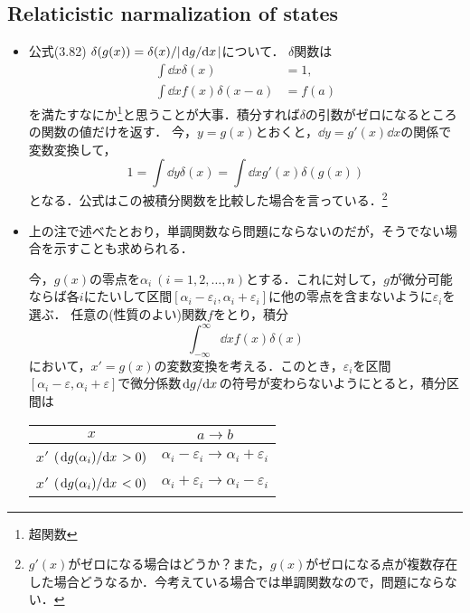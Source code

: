 \subsection{Relaticistic narmalization of states}
\begin{itemize}
		\item 公式(3.82) $\delta(g(x)) = \delta(x)/\lvert\dv*{g}{x}\rvert$について．
				$\delta $関数は
				\begin{align}
						\int \dd{x} \delta(x) &= 1, \\
						\int \dd{x} f(x)\delta(x-a) &= f(a)
				\end{align}
				を満たすなにか\footnote{超関数}と思うことが大事．積分すれば$\delta $の引数がゼロになるところの関数の値だけを返す．
				今，$y=g(x)  $とおくと，$\dd{y} = g'(x)\dd{x} $の関係で変数変換して，
				\begin{equation}
						1 = \int\dd{y} \delta(x) = \int \dd{x}g'(x)\delta(g(x))
				\end{equation}
				となる．公式はこの被積分関数を比較した場合を言っている．\footnote{$g'(x)$がゼロになる場合はどうか？また，$g(x) $がゼロになる点が複数存在した場合どうなるか．今考えている場合では単調関数なので，問題にならない．}
		\item 上の注で述べたとおり，単調関数なら問題にならないのだが，そうでない場合を示すことも求められる．

				今，$g(x) $の零点を$\alpha_i \ (i=1, 2, \ldots, n)$とする．これに対して，$g $が微分可能ならば各$i $にたいして区間$[\alpha_i-\varepsilon_i, \alpha_i + \varepsilon_i] $に他の零点を含まないように$\varepsilon_i $を選ぶ．
				任意の(性質のよい)関数$f $をとり，積分
				\begin{equation}
						\int_{-\infty}^{\infty}\dd{x}f(x)\delta(x)
				\end{equation}
				において，$x' = g(x) $の変数変換を考える．このとき，$\varepsilon_i $を区間$[\alpha_i-\varepsilon, \alpha_i+\varepsilon] $で微分係数$\dv*{g}{x} $の符号が変わらないようにとると，積分区間は
				\begin{table}[htbp]
						\centering
						\begin{tabular}{c|c}\hline
								$x $ & $a \to b$\\\hline
								 $x' $ $(\dv*{g(\alpha_i)}{x}>0 )$ & $\alpha_i-\varepsilon_i \to \alpha_i + \varepsilon_i $\\\hline
								 $x' $ $(\dv*{g(\alpha_i)}{x}<0 )$& $\alpha_i+\varepsilon_i \to \alpha_i-\varepsilon_i$\\\hline
						\end{tabular}
				\end{table}


\end{itemize}
